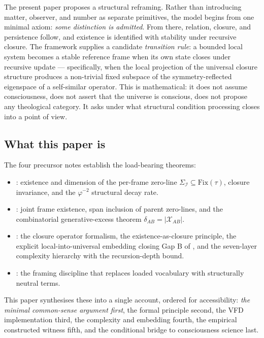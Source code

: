 \documentclass[11pt]{article}
\theoremstyle{plain}
\theoremstyle{definition}
\theoremstyle{remark}
\newcommand{\Ical}{\mathcal{I}}
\newcommand{\Fix}{\mathrm{Fix}}
\newcommand{\Xcal}{\mathcal{X}}
\begin{document}
The present paper proposes a structural reframing. Rather than introducing matter, observer, and number as separate primitives, the model begins from one minimal axiom: \emph{some distinction is admitted}. From there, relation, closure, and persistence follow, and existence is identified with stability under recursive closure. The framework supplies a candidate \emph{transition rule}: a bounded local system becomes a stable reference frame when its own state closes under recursive update --- specifically, when the local projection of the universal closure structure produces a non-trivial fixed subspace of the symmetry-reflected eigenspace of a self-similar operator. This is mathematical: it does not assume consciousness, does not assert that the universe is conscious, does not propose any theological category. It asks under what structural condition processing closes into a point of view.

\subsection{What this paper is}

The four precursor notes establish the load-bearing theorems:

\begin{itemize}[leftmargin=2em]
\item \citet{PerObserverZeroLine}: existence and dimension of the per-frame zero-line $\Sigma_\Ical \subseteq \Fix(\tau)$, closure invariance, and the $\varphi^{-2}$ structural decay rate.
\item \citet{JointObserverInstance}: joint frame existence, span inclusion of parent zero-lines, and the combinatorial generative-excess theorem $\delta_{AB} = |\Xcal_{AB}|$.
\item \citet{AlgebraicExistence}: the closure operator formalism, the existence-as-closure principle, the explicit local-into-universal embedding closing Gap B of \citet{PerObserverZeroLine}, and the seven-layer complexity hierarchy with the recursion-depth bound.
\item \citet{ExistenceAsClosure}: the framing discipline that replaces loaded vocabulary with structurally neutral terms.
\end{itemize}

This paper synthesises these into a single account, ordered for accessibility: \emph{the minimal common-sense argument first}, the formal principle second, the VFD implementation third, the complexity and embedding fourth, the empirical constructed witness fifth, and the conditional bridge to consciousness science last.
\end{document}
